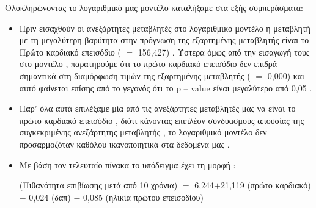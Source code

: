 \clearpage
Ολοκληρώνοντας το λογαριθμικό μας μοντέλο καταλήξαμε στα εξής συμπεράσματα:

\begin{itemize}
    \item Πριν εισαχθούν οι ανεξάρτητες μεταβλητές στο λογαριθμικό μοντέλο η μεταβλητή με τη μεγαλύτερη βαρύτητα στην πρόγνωση της εξαρτημένης μεταβλητής είναι το Πρώτο καρδιακό επεισόδιο ( $=$ 156,427) . Ύστερα όμως από την εισαγωγή τους στο μοντέλο , παρατηρούμε ότι το πρώτο καρδιακό επεισόδιο δεν επιδρά σημαντικά στη διαμόρφωση τιμών της εξαρτημένης μεταβλητής ( $=$ 0,000) και αυτό φαίνεται επίσης από το γεγονός ότι το p – value είναι μεγαλύτερο από 0,05  .
    \item Παρ’ όλα αυτά επιλέξαμε μία από τις ανεξάρτητες μεταβλητές μας να είναι το πρώτο καρδιακό επεισόδιο , διότι κάνοντας επιπλέον συνδυασμούς απουσίας της συγκεκριμένης ανεξάρτητης μεταβλητής , το λογαριθμικό μοντέλο δεν προσαρμοζόταν καθόλου ικανοποιητικά στα δεδομένα μας .
    \item Με βάση τον τελευταίο πίνακα το υπόδειγμα έχει τη μορφή : 
  
    \vspace{1cm}
    
    (Πιθανότητα επιβίωσης μετά από 10 χρόνια) $=$ 6,244$+$21,119 (πρώτο καρδιακό) $-$ 0,024 (δαπ) $-$ 0,085 (ηλικία πρώτου επεισοδίου)  
    
\end{itemize}